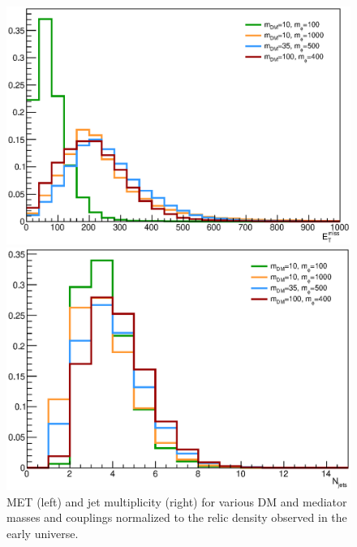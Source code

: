 \begin{figure}[h!]
    \begin{minipage}{0.49\textwidth}
      \centering 
      \includegraphics[scale=0.32]{figures/bFDM/bfdm_relic/missing_et.eps}
    \end{minipage}
    \hfill
    \begin{minipage}{0.49\textwidth}
      \centering 
      \includegraphics[scale=0.32]{figures/bFDM/bfdm_relic/Njets.eps}
    \end{minipage}
    \caption{MET (left) and jet multiplicity (right) for various DM and mediator masses and couplings normalized to the relic density observed in the early universe. \label{fig:relic}}
\end{figure}

